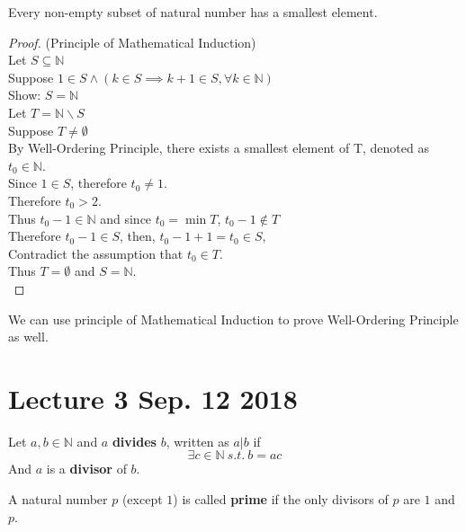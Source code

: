 \documentclass[11pt]{article}
\begin{document}
	\begin{theorem}
		Every non-empty subset of natural number has a smallest element.
	\end{theorem}

	\begin{proof} (Principle of Mathematical Induction)\\
		Let $S \subseteq \mathbb{N}$ \\
		Suppose $1 \in S \land (k \in S \implies k+1 \in S, \forall k \in \mathbb{N})$ \\
		Show: $S = \mathbb{N}$ \\
		Let $T = \mathbb{N} \backslash S$ \\
		Suppose $T \neq \emptyset$ \\
		By Well-Ordering Principle, there exists a smallest element of T, denoted as $t_0 \in \mathbb{N}$. \\
		Since $1 \in S$, therefore $t_0 \neq 1$. \\
		Therefore $t_0 > 2$. \\
		Thus $t_0 - 1 \in \mathbb{N}$ and since $t_0 = \min{T}$, $t_0 - 1 \notin T$ \\
		Therefore $t_0 - 1 \in S$, then, $t_0 - 1 + 1 = t_0 \in S$, \\
		Contradict the assumption that $t_0 \in T$. \\
		Thus $T = \emptyset$ and $S = \mathbb{N}$. \\
	\end{proof}
	
	\begin{remark}
		We can use principle of Mathematical Induction to prove Well-Ordering Principle as well.
	\end{remark}
	
	\section{Lecture 3 Sep. 12 2018}
	\begin{definition}
		Let $a, b \in \mathbb{N}$ and $a$ \textbf{divides} $b$, written as $a | b$ if 
		\[
			\exists c \in \mathbb{N}\ s.t.\ b = ac
		\]
		And $a$ is a \textbf{divisor} of $b$.
	\end{definition}
	
	\begin{definition}
		A natural number $p$ (except $1$) is called \textbf{prime} if the only divisors of $p$ are $1$ and $p$.
	\end{definition}
	
\end{document}

